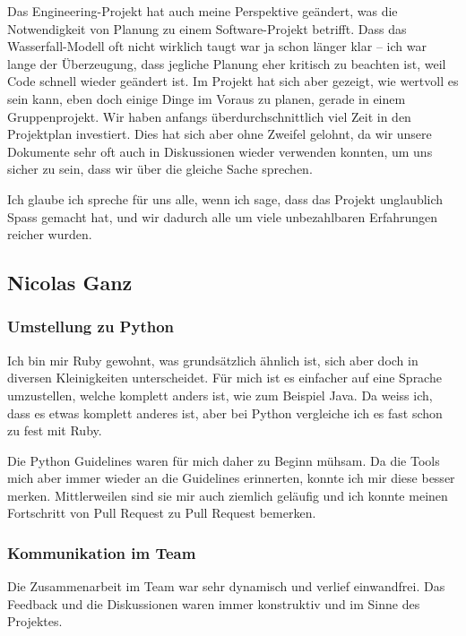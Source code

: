 \documentclass[a4paper]{article}
\begin{document}
Das Engineering-Projekt hat auch meine Perspektive geändert, was die
Notwendigkeit von Planung zu einem Software-Projekt betrifft. Dass das
Wasserfall-Modell oft nicht wirklich taugt war ja schon länger klar -- ich war
lange der Überzeugung, dass jegliche Planung eher kritisch zu beachten ist, weil
Code schnell wieder geändert ist. Im Projekt hat sich aber gezeigt, wie wertvoll
es sein kann, eben doch einige Dinge im Voraus zu planen, gerade in einem
Gruppenprojekt. Wir haben anfangs überdurchschnittlich viel Zeit in den
Projektplan investiert. Dies hat sich aber ohne Zweifel gelohnt, da wir unsere
Dokumente sehr oft auch in Diskussionen wieder verwenden konnten, um uns sicher
zu sein, dass wir über die gleiche Sache sprechen.

Ich glaube ich spreche für uns alle, wenn ich sage, dass das Projekt
unglaublich Spass gemacht hat, und wir dadurch alle um viele unbezahlbaren
Erfahrungen reicher wurden.

\pagebreak

\subsection{Nicolas Ganz}

\subsubsection{Umstellung zu Python}

Ich bin mir Ruby gewohnt, was grundsätzlich ähnlich ist, sich aber doch in diversen Kleinigkeiten unterscheidet.
Für mich ist es einfacher auf eine Sprache umzustellen, welche komplett anders ist, wie zum Beispiel Java.
Da weiss ich, dass es etwas komplett anderes ist, aber bei Python vergleiche ich es fast schon zu fest mit Ruby.

Die Python Guidelines waren für mich daher zu Beginn mühsam.
Da die Tools mich aber immer wieder an die Guidelines erinnerten, konnte ich mir diese besser merken.
Mittlerweilen sind sie mir auch ziemlich geläufig und ich konnte meinen Fortschritt von Pull Request zu Pull Request bemerken.

\subsubsection{Kommunikation im Team}

Die Zusammenarbeit im Team war sehr dynamisch und verlief einwandfrei.
Das Feedback und die Diskussionen waren immer konstruktiv und im Sinne des Projektes.
\end{document}
